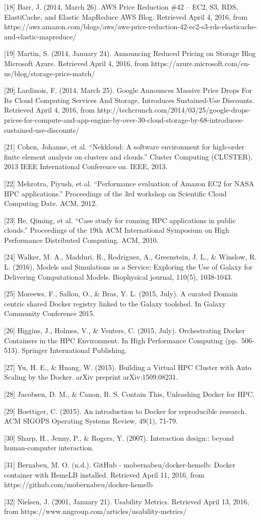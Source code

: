 \documentclass[]{article}
\begin{document}
{[}18{]} Barr, J. (2014, March 26). AWS Price Reduction \#42 -- EC2, S3,
RDS, ElastiCache, and Elastic MapReduce \textbar{} AWS Blog. Retrieved
April 4, 2016, from
https://aws.amazon.com/blogs/aws/aws-price-reduction-42-ec2-s3-rds-elasticache-and-elastic-mapreduce/

{[}19{]} Martin, S. (2014, January 24). Announcing Reduced Pricing on
Storage \textbar{} Blog \textbar{} Microsoft Azure. Retrieved April 4,
2016, from https://azure.microsoft.com/en-us/blog/storage-price-match/

{[}20{]} Lardinois, F. (2014, March 25). Google Announces Massive Price
Drops For Its Cloud Computing Services And Storage, Introduces
Sustained-Use Discounts. Retrieved April 4, 2016, from
http://techcrunch.com/2014/03/25/google-drops-prices-for-compute-and-app-engine-by-over-30-cloud-storage-by-68-introduces-sustained-use-discounts/

{[}21{]} Cohen, Johanne, et al. ``Nekkloud: A software environment for
high-order finite element analysis on clusters and clouds.'' Cluster
Computing (CLUSTER), 2013 IEEE International Conference on. IEEE, 2013.

{[}22{]} Mehrotra, Piyush, et al. ``Performance evaluation of Amazon EC2
for NASA HPC applications.'' Proceedings of the 3rd workshop on
Scientific Cloud Computing Date. ACM, 2012.

{[}23{]} He, Qiming, et al. ``Case study for running HPC applications in
public clouds.'' Proceedings of the 19th ACM International Symposium on
High Performance Distributed Computing. ACM, 2010.

{[}24{]} Walker, M. A., Madduri, R., Rodriguez, A., Greenstein, J. L.,
\& Winslow, R. L. (2016). Models and Simulations as a Service: Exploring
the Use of Galaxy for Delivering Computational Models. Biophysical
journal, 110(5), 1038-1043.

{[}25{]} Moreews, F., Sallou, O., \& Bras, Y. L. (2015, July). A curated
Domain centric shared Docker registry linked to the Galaxy toolshed. In
Galaxy Community Conference 2015.

{[}26{]} Higgins, J., Holmes, V., \& Venters, C. (2015, July).
Orchestrating Docker Containers in the HPC Environment. In High
Performance Computing (pp.~506-513). Springer International Publishing.

{[}27{]} Yu, H. E., \& Huang, W. (2015). Building a Virtual HPC Cluster
with Auto Scaling by the Docker. arXiv preprint arXiv:1509.08231.

{[}28{]} Jacobsen, D. M., \& Canon, R. S. Contain This, Unleashing
Docker for HPC.

{[}29{]} Boettiger, C. (2015). An introduction to Docker for
reproducible research. ACM SIGOPS Operating Systems Review, 49(1),
71-79.

{[}30{]} Sharp, H., Jenny, P., \& Rogers, Y. (2007). Interaction
design:: beyond human-computer interaction.

{[}31{]} Bernabeu, M. O. (n.d.). GitHub - mobernabeu/docker-hemelb:
Docker container with HemeLB installed. Retrieved April 11, 2016, from
https://github.com/mobernabeu/docker-hemelb

{[}32{]} Nielsen, J. (2001, January 21). Usability Metrics. Retrieved
April 13, 2016, from https://www.nngroup.com/articles/usability-metrics/
\end{document}
